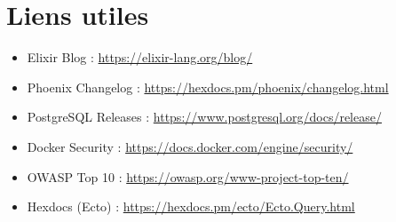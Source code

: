 \section{Liens utiles}
\begin{itemize}
    \item Elixir Blog : \url{https://elixir-lang.org/blog/}
    \item Phoenix Changelog : \url{https://hexdocs.pm/phoenix/changelog.html}
    \item PostgreSQL Releases : \url{https://www.postgresql.org/docs/release/}
    \item Docker Security : \url{https://docs.docker.com/engine/security/}
    \item OWASP Top 10 : \url{https://owasp.org/www-project-top-ten/}
    \item Hexdocs (Ecto) : \url{https://hexdocs.pm/ecto/Ecto.Query.html}
\end{itemize}